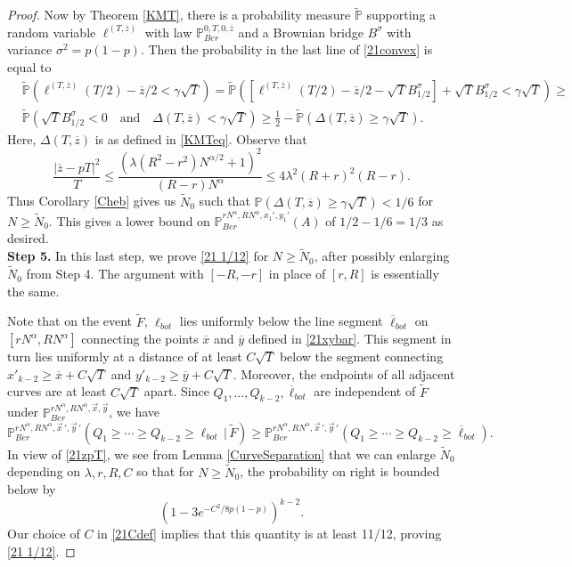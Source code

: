 \begin{proof}
		Now by Theorem \ref{KMT}, there is a probability measure $\tilde{\mathbb{P}}$ supporting a random variable $\ell^{(T,\overline{z})}$ with law $\mathbb{P}^{0,T,0,\overline{z}}_{Ber}$ and a Brownian bridge $B^\sigma$ with variance $\sigma^2 = p(1-p)$. Then the probability in the last line of \eqref{21convex} is equal to
		\begin{align*}
		& \tilde{\mathbb{P}}\left( \ell^{(T,\overline{z})}(T/2) - \overline{z}/2 < \gamma\sqrt{T}\right) = \tilde{\mathbb{P}}\left(\left[\ell^{(T,\overline{z})}(T/2) - \overline{z}/2 - \sqrt{T}B^\sigma_{1/2}\right] + \sqrt{T}B^\sigma_{1/2} < \gamma\sqrt{T}\right) \geq \\
		& \tilde{\mathbb{P}}\left(\sqrt{T}B^\sigma_{1/2} < 0\quad\mathrm{and}\quad \Delta(T,\overline{z}) < \gamma\sqrt{T}\right) \geq \frac{1}{2} - \tilde{\mathbb{P}}\left(\Delta(T,\overline{z}) \geq \gamma\sqrt{T}\right).
		\end{align*}
		Here, $\Delta(T,\overline{z})$ is as defined in \eqref{KMTeq}. Observe that
		\begin{equation}\label{21zpT}
		\frac{|\overline{z} - pT|^2}{T} \leq \frac{(\lambda(R^2-r^2) N^{\alpha/2} + 1)^2}{(R-r)N^\alpha} \leq 4\lambda^2(R+r)^2(R-r).
		\end{equation}
		Thus Corollary \ref{Cheb} gives us $\tilde{N}_0$ such that $\mathbb{P}(\Delta(T,\overline{z})\geq \gamma\sqrt{T})<1/6$ for $N\geq \tilde{N}_0$. This gives a lower bound on $\mathbb{P}^{rN^\alpha, RN^\alpha,x_1',y_1'}_{Ber} (A)$ of $1/2 - 1/6 = 1/3$ as desired.\\
		
		\noindent\textbf{Step 5.} In this last step, we prove \eqref{21 1/12} for $N\geq \tilde{N}_0$, after possibly enlarging $\tilde{N}_0$ from Step 4. The argument with $[-R,-r]$ in place of $[r,R]$ is essentially the same. 
		
		Note that on the event $\tilde F$, $\ell_{bot}$ lies uniformly below the line segment $\overline{\ell}_{bot}$  on $[rN^\alpha,RN^\alpha]$ connecting the points $\overline{x}$ and $\overline{y}$ defined in \eqref{21xybar}. This segment in turn lies uniformly at a distance of at least $C\sqrt{T}$ below the segment connecting $x'_{k-2} \geq \overline{x} + C\sqrt{T}$ and $y'_{k-2} \geq \overline{y} + C\sqrt{T}$. Moreover, the endpoints of all adjacent curves are at least $C\sqrt{T}$ apart. Since $Q_1,\dots,Q_{k-2},\overline \ell_{bot}$ are independent of $\tilde F$ under $\mathbb{P}^{rN^\alpha, RN^\alpha,\vec{x},\vec{y}}_{Ber}$, we have 
		\[
		\mathbb{P}^{rN^\alpha, RN^\alpha,\vec{x}\,',\vec{y}\,'}_{Ber} \left(Q_1 \geq \cdots \geq Q_{k-2} \geq \ell_{bot} \,\big|\,\tilde F \right) \geq \mathbb{P}^{rN^\alpha, RN^\alpha,\vec{x}\,',\vec{y}\,'}_{Ber} \left(Q_1 \geq \cdots \geq Q_{k-2} \geq \overline \ell_{bot}\right).
		\]
		In view of \eqref{21zpT}, we see from Lemma \ref{CurveSeparation} that we can enlarge $\tilde{N}_0$ depending on $\lambda, r, R, C$ so that for $N\geq\tilde{N}_0$, the probability on right is bounded below by
		\[
		\left(1-3e^{-C^2/8p(1-p)}\right)^{k-2}.
		\]
		Our choice of $C$ in \eqref{21Cdef} implies that this quantity is at least 11/12, proving \eqref{21 1/12}.
		
	\end{proof}


